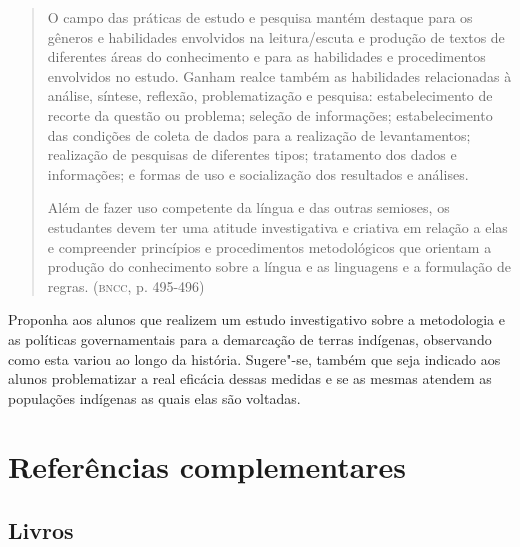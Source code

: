 \documentclass[12pt]{extarticle}
\begin{document}
\begin{quote}
O campo das práticas de estudo e pesquisa mantém destaque para os
gêneros e habilidades envolvidos na leitura/escuta e produção de textos
de diferentes áreas do conhecimento e para as habilidades e
procedimentos envolvidos no estudo. Ganham realce também as habilidades
relacionadas à análise, síntese, reflexão, problematização e pesquisa:
estabelecimento de recorte da questão ou problema; seleção de
informações; estabelecimento das condições de coleta de dados para a
realização de levantamentos; realização de pesquisas de diferentes
tipos; tratamento dos dados e informações; e formas de uso e
socialização dos resultados e análises.

Além de fazer uso competente da língua e das outras semioses, os
estudantes devem ter uma atitude investigativa e criativa em relação a
elas e compreender princípios e procedimentos metodológicos que orientam
a produção do conhecimento sobre a língua e as linguagens e a formulação
de regras. (\textsc{bncc}, p. 495-496)
\end{quote}

Proponha aos alunos que realizem um estudo investigativo sobre a
metodologia e as políticas governamentais para a demarcação de terras
indígenas, observando como esta variou ao longo da história.
Sugere"-se, também que seja indicado aos alunos problematizar a real
eficácia dessas medidas e se as mesmas atendem as populações indígenas
as quais elas são voltadas.








\section{Referências complementares}

\subsection{Livros}
\end{document}
